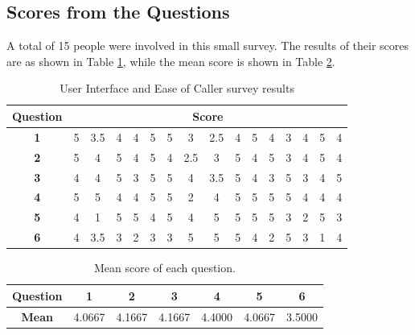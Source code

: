 \documentclass[main.tex]{subfiles}
\begin{document}
\subsection{Scores from the Questions}
A total of 15 people were involved in this small survey. The results of their scores are as shown in Table \ref{tbl:survey}, while the mean score is shown in Table \ref{tbl:mean}.

\begin{table}[htb]
\centering
\begin{tabular}{|c|ccccccccccccccc|}
	\hline
\textbf{Question} & \multicolumn{15}{|c|}{\textbf{Score}} \\\hline
\textbf{1} & 5 & 3.5 & 4 & 4 & 5 & 5 & 3 & 2.5 & 4 & 5 & 4 & 3 & 4 & 5 & 4 \\
\textbf{2} & 5 & 4 & 5 & 4 & 5 & 4 & 2.5 & 3 & 5 & 4 & 5 & 3 & 4 & 5 & 4 \\
\textbf{3} & 4 & 4 & 5 & 3 & 5 & 5 & 4 & 3.5 & 5 & 4 & 3 & 5 & 3 & 4 & 5 \\
\textbf{4} & 5 & 5 & 4 & 4 & 5 & 5 & 2 & 4 & 5 & 5 & 5 & 5 & 4 & 4 & 4 \\
\textbf{5} & 4 & 1 & 5 & 5 & 4 & 5 & 4 & 5 & 5 & 5 & 5 & 3 & 2 & 5 & 3 \\
\textbf{6} & 4 & 3.5 & 3 & 2 & 3 & 3 & 5 & 5 & 5 & 4 & 2 & 5 & 3 & 1 & 4\\\hline
\end{tabular}
\caption{User Interface and Ease of Caller survey results}
\label{tbl:survey}
\end{table}

\begin{table}[htb]
\centering
\begin{tabular}{|c|cccccc|}
	\hline
\textbf{Question} & 1 & 2 & 3 & 4 & 5 & 6\\\hline
\textbf{Mean} & 4.0667   & 4.1667   & 4.1667    &4.4000   & 4.0667   & 3.5000\\\hline
\end{tabular}
\caption{Mean score of each question.}
\label{tbl:mean}
\end{table}
\end{document}
